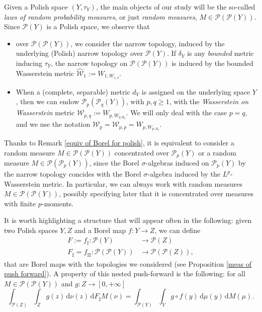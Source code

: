 \documentclass[10pt,leqno]{amsart}
\numberwithin{equation}{section}
\newcommand{\PP}{\mathcal{P}}
\renewcommand{\d}{\mathrm{d}}
\begin{document}
Given a Polish space $(Y,\tau_Y)$, the main objects of our study will be the so-called \textit{laws of random probability measures}, or just \textit{random measures}, 
$M \in \PP(\PP(Y))$. 
Since $\PP(Y)$ is a Polish space,
we observe that \nc 
\begin{itemize}
    \item over $\PP(\PP(Y))$, we consider the narrow topology, 
    induced by 
    the underlying (Polish) narrow topology over $\PP(Y)$. 
    If $\delta_Y$ is 
    any \emph{bounded} metric
    inducing $\tau_Y$,
    the narrow topology on $\PP(\PP(Y))$
    is induced by the 
    bounded Wasserstein metric
    $\widehat{\mathcal{W}}_1:= 
    W_{1,W_{1,\delta}}$. 
    \item 
    When 
    a (complete, separable) metric $d_Y$ 
    is assigned on the underlying space $Y$, 
    then we can endow
    $\PP_p(\PP_q(Y))$, with $p,q\geq 1$,
    with the 
    \emph{Wasserstein on Wasserstein} 
    metric 
    $\mathcal{W}_{p,q}:= W_{p,W_{q,d_Y}}$.
    We will only 
    deal with 
    the case $p=q$, and we use the notation $\mathcal{W}_p = \mathcal{W}_{p,p}
    =W_{p,W_{p,d_Y}}$.
\end{itemize}
Thanks to Remark \ref{equiv of Borel for polish}, it is equivalent to consider a random measure $M\in \PP(\PP(Y))$ concentrated over $\PP_p(Y)$ or a random measure $M\in\PP(\PP_p(Y))$, since the Borel $\sigma$-algebras induced on $\PP_p(Y)$ by the narrow topology 
concides with 
the Borel $\sigma$-algebra 
induced by the $L^p$-Wasserstein 
metric. In particular, we can always work with random measures $M\in \PP(\PP(Y))$, possibly specifying later that it is concentrated over measures with finite $p$-moments.

It is worth highlighting a structure that will appear often in the following: given two Polish spaces $Y,Z$ and a Borel map $f:Y\to Z$, we can define
\begin{equation}\label{push forward of push forward}
\begin{aligned}
    F:= f_\sharp  : \PP(Y) &\to \PP(Z)
    \\
    F_\sharp=f_{\sharp\sharp} : \PP(\PP(Y)) &\to \PP(\PP(Z)),
\end{aligned}
\end{equation}
that are Borel maps with the topologies we considered (see Proposition \ref{meas of push forward}). A property of this nested push-forward is the following: for all $M\in \PP(\PP(Y))$ and $g:Z\to [0,+\infty]$
\begin{equation}\label{property of push for of push for}
    \int_{\PP(Z)} \int_Z g(z) \,\d\nu(z) \,\d F_\sharp M(\nu) = \int_{\PP(Y)} \int_{Y} g\circ f(y) \,\d\mu(y) \,\d M(\mu).
\end{equation}
\end{document}
